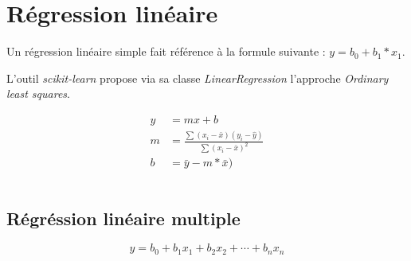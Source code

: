 \chapter{R\'egression lin\'eaire}


Un régression linéaire simple fait référence à la formule suivante : $y = b_0 + b_1 * x_1$. 

L'outil \textit{scikit-learn} propose via sa classe \textit{LinearRegression} l'approche \textit{Ordinary least squares}.

\begin{align}
    y &= mx + b \\
    m &= \frac{\sum(x_i - \bar{x})(y_i - \hat{y})}{\sum(x_i - \bar{x})^2} \\
    b &= \bar{y} - m * \bar{x})
\end{align}

\inputminted{python2}{code/machine-learning/linear-regression.py}



\section{R\'egr\'ession lin\'eaire multiple}

\begin{equation}
	y = b_0 + b_1x_1 + b_2x_2 + \cdots + b_nx_n
\end{equation}